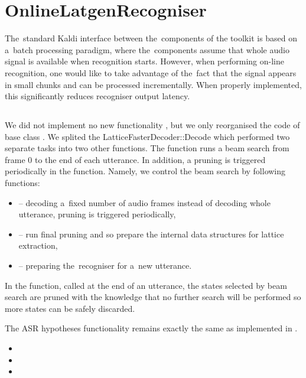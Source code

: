 \section{OnlineLatgenRecogniser}
\label{sec:rec}

The~standard Kaldi interface between the~components of the toolkit is based on a~batch processing paradigm, where the~components assume that whole audio signal is available when recognition starts.
However, when performing on-line recognition, one would like to take advantage of the~fact that the signal appears in small chunks and can be processed incrementally.
When properly implemented, this significantly reduces recogniser output latency.

\subsection{}
\label{sub:dec}
We did not implement no new functionality , but we only reorganised the code of base class .
We splited the LatticeFasterDecoder::Decode which performed two separate tasks into two other functions.
The  function runs a beam search from frame 0 to the end of each utterance.
In addition, a pruning is triggered periodically in the function.
Namely, we control the beam search by following functions: 
\begin{itemize}
\item {} -- decoding a~fixed number of audio frames instead of decoding whole utterance, pruning is triggered periodically,
\item {} -- run final pruning and so prepare the internal data structures for lattice extraction,
\item {} -- preparing the~recogniser for a~new utterance.
\end{itemize}
In the  function, called at the end of an utterance, the states selected by beam search are pruned with the knowledge that no further search will be performed so more states can be safely discarded.

The \ac{ASR} hypotheses functionality remains exactly the same as implemented in .
\begin{itemize}
    \item {}
    \item {}
    \item {}
\end{itemize}




